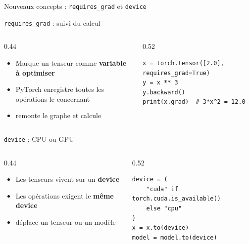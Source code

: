 \documentclass[aspectratio=169, 10pt]{beamer}
\begin{document}
\begin{frame}[fragile]{Nouveaux concepts : \texttt{requires\_grad} et \texttt{device}}
  \begin{block}{\texttt{requires\_grad} : suivi du calcul}
    \begin{columns}[T]
      \begin{column}{0.44\textwidth}
        \begin{itemize}
          \item Marque un tenseur comme \textbf{variable à optimiser}
          \item PyTorch enregistre toutes les opérations le concernant
          \item {} remonte le graphe et calcule 
        \end{itemize}
      \end{column}
      \begin{column}{0.52\textwidth}
        \begin{lstlisting}[style=pythonstyle]
x = torch.tensor([2.0], requires_grad=True)
y = x ** 3
y.backward()
print(x.grad)  # 3*x^2 = 12.0
        \end{lstlisting}
      \end{column}
    \end{columns}
  \end{block}
  \medskip
  \begin{block}{\texttt{device} : CPU ou GPU}
    \begin{columns}[T]
      \begin{column}{0.44\textwidth}
        \begin{itemize}
          \item Les tenseurs vivent sur un \textbf{device}
          \item Les opérations exigent le \textbf{même device}
          \item {} déplace un tenseur ou un modèle
        \end{itemize}
      \end{column}
      \begin{column}{0.52\textwidth}
        \begin{lstlisting}[style=pythonstyle]
device = (
    "cuda" if torch.cuda.is_available()
    else "cpu"
)
x = x.to(device)
model = model.to(device)
        \end{lstlisting}
      \end{column}
    \end{columns}
  \end{block}
\end{frame}
\end{document}
